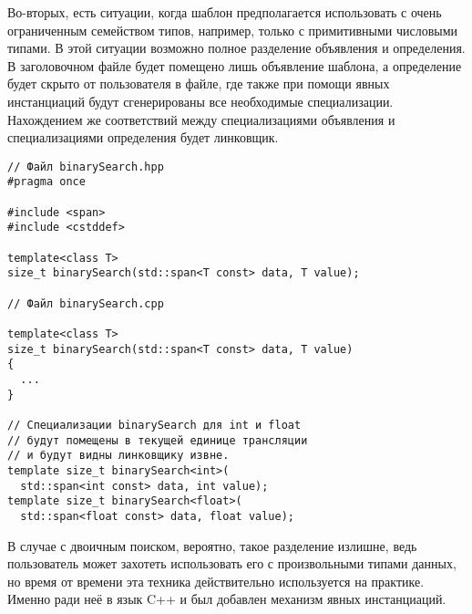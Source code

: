 Во-вторых, есть ситуации, когда шаблон предполагается использовать с очень ограниченным семейством типов, например, только с примитивными числовыми типами.
В этой ситуации возможно полное разделение объявления и определения. В заголовочном файле будет помещено лишь объявление шаблона, а определение будет скрыто от пользователя в  файле, где также при помощи явных инстанциаций будут сгенерированы все необходимые специализации.
Нахождением же соответствий между специализациями объявления и специализациями определения будет линковщик.
\begin{verbatim}
// Файл binarySearch.hpp
#pragma once

#include <span>
#include <cstddef>

template<class T>
size_t binarySearch(std::span<T const> data, T value);

// Файл binarySearch.cpp

template<class T>
size_t binarySearch(std::span<T const> data, T value)
{
  ...
}

// Специализации binarySearch для int и float
// будут помещены в текущей единице трансляции
// и будут видны линковщику извне.
template size_t binarySearch<int>(
  std::span<int const> data, int value);
template size_t binarySearch<float>(
  std::span<float const> data, float value);
\end{verbatim}
В случае с двоичным поиском, вероятно, такое разделение излишне, ведь пользователь может захотеть использовать его с произвольными типами данных, но время от времени эта техника действительно используется на практике.
Именно ради неё в язык C++ и был добавлен механизм явных инстанциаций.

